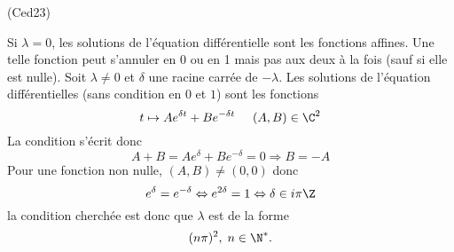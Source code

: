 \begin{tiny}(Ced23)\end{tiny} Si $\lambda = 0$, les solutions de l'équation différentielle sont les fonctions affines. Une telle fonction peut s'annuler en 0 ou en 1 mais pas aux deux à la fois (sauf si elle est nulle).\newline
Soit $\lambda \neq 0$ et $\delta$ une racine carrée de $-\lambda$. Les solutions de l'équation différentielles (sans condition en $0$ et $1$) sont les fonctions
\[
 t \mapsto A e^{\delta t} + B e^{-\delta t} \hspace{0.5cm} (A,B)\in \C^2
\]
La condition s'écrit donc
\begin{displaymath}
 A + B = A e^{\delta} + Be^{-\delta} = 0 \Rightarrow 
 B = -A 
\end{displaymath}
Pour une fonction non nulle, $(A,B)\neq(0,0)$ donc
\[
 e^{\delta} = e^{-\delta}\Leftrightarrow e^{2\delta} = 1
 \Leftrightarrow \delta \in i\pi \Z
\]
la condition cherchée est donc que $\lambda$ est de la forme
\[
 (n\pi)^2, \; n\in \N^*.
\]
